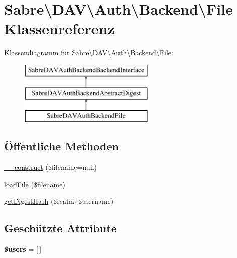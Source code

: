 \hypertarget{class_sabre_1_1_d_a_v_1_1_auth_1_1_backend_1_1_file}{}\section{Sabre\textbackslash{}D\+AV\textbackslash{}Auth\textbackslash{}Backend\textbackslash{}File Klassenreferenz}
\label{class_sabre_1_1_d_a_v_1_1_auth_1_1_backend_1_1_file}
Klassendiagramm für Sabre\textbackslash{}D\+AV\textbackslash{}Auth\textbackslash{}Backend\textbackslash{}File\+:\begin{figure}[H]
\begin{center}
\leavevmode
\includegraphics[height=3.000000cm]{class_sabre_1_1_d_a_v_1_1_auth_1_1_backend_1_1_file}
\end{center}
\end{figure}
\subsection*{Öffentliche Methoden}
\begin{DoxyCompactItemize}
\item 
\mbox{\hyperlink{class_sabre_1_1_d_a_v_1_1_auth_1_1_backend_1_1_file_a9e267641e8da23b83338f7b27c2daef3}{\+\_\+\+\_\+construct}} (\$filename=null)
\item 
\mbox{\hyperlink{class_sabre_1_1_d_a_v_1_1_auth_1_1_backend_1_1_file_a1dae0863ae70e48299ef2b550d8709e2}{load\+File}} (\$filename)
\item 
\mbox{\hyperlink{class_sabre_1_1_d_a_v_1_1_auth_1_1_backend_1_1_file_a1efe27436ef25c589c35e84cea0bb837}{get\+Digest\+Hash}} (\$realm, \$username)
\end{DoxyCompactItemize}
\subsection*{Geschützte Attribute}
\begin{DoxyCompactItemize}
\item 
\mbox{\label{class_sabre_1_1_d_a_v_1_1_auth_1_1_backend_1_1_file_a1ad99d02df557e3160309539b5012e83}} 
{\bfseries \$users} = \mbox{[}$\,$\mbox{]}
\end{DoxyCompactItemize}


